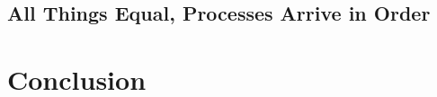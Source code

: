 \documentclass[12pt]{article}
\begin{document}
  \subsection{All Things Equal, Processes Arrive in Order}

\section{Conclusion}

\newpage
\begin{appendix}
  \listoffigures
  \listoftables
\end{appendix}
\end{document}
